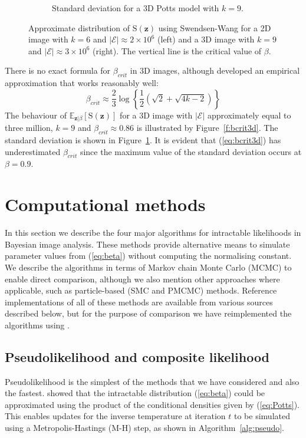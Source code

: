 \documentclass[nojss,shortnames]{jss}\usepackage[]{graphicx}\usepackage[]{color}
\begin{document}
\begin{figure}
\begin{subfigure}{0.45\textwidth}
                \caption{Standard deviation for a 3D Potts model with $k = 9$.}
                \label{f:bcrit3d_sd}
        \end{subfigure}%
\caption{Approximate distribution of $\mathrm{S}(\mathbf{z})$ using Swendsen-Wang for a 2D image with $k=6$ and $|\mathcal{E}| \approx 2 \times 10^6$ (left) and a 3D image with $k=9$ and $|\mathcal{E}| \approx 3 \times 10^6$ (right). The vertical line is the critical value of $\beta$.}
\label{f:bcrit}
\end{figure}

There is no exact formula for $\beta_{crit}$ in 3D images, although \citet{Hajdukovic1983} developed an empirical approximation that works reasonably well:
  \begin{equation}
  \label{eq:bcrit3d}
\beta_{crit}  \approx \frac{2}{3} \log\left\{ \frac{1}{2} \left(\sqrt{2} + \sqrt{4k-2}\right) \right\}
  \end{equation}
The behaviour of $\mathbb{E}_{\mathbf{z} | \beta}[\mathrm{S}(\mathbf{z})]$ for a 3D image with $|\mathcal{E}|$ approximately equal to three million, $k=9$ and $\beta_{crit} \approx 0.86$ is illustrated by Figure~\ref{f:bcrit3d}. The standard deviation is shown in Figure~\ref{f:bcrit3d_sd}. It is evident that (\ref{eq:bcrit3d}) has underestimated $\beta_{crit}$ since the maximum value of the standard deviation occurs at $\beta = 0.9$.

\section{Computational methods}
\label{s:methods}
In this section we describe the four major algorithms for intractable likelihoods in Bayesian image analysis. These methods provide alternative means to simulate parameter values from (\ref{eq:beta}) without computing the normalising constant. We describe the algorithms in terms of Markov chain Monte Carlo (MCMC) to enable direct comparison, although we also mention other approaches where applicable, such as particle-based (SMC and PMCMC) methods. Reference implementations of all of these methods are available from various sources described below, but for the purpose of comparison we have reimplemented the algorithms using  \citep{Eddelbuettel2013}.

\subsection{Pseudolikelihood and composite likelihood}
Pseudolikelihood is the simplest of the methods that we have considered and also the fastest. \citet{Ryden1998} showed that the intractable distribution (\ref{eq:beta}) could be approximated using the product of the conditional densities given by (\ref{eq:Potts}). This enables updates for the inverse temperature at iteration $t$ to be simulated using a Metropolis-Hastings (M-H) step, as shown in Algorithm~\ref{alg:pseudo}. 
\end{document}
